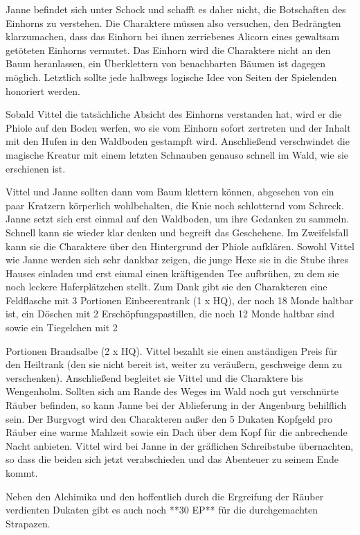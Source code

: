 Janne befindet sich unter Schock und schafft es daher nicht, die Botschaften des Einhorns zu verstehen. Die Charaktere müssen also versuchen, den Bedrängten klarzumachen, dass das Einhorn bei ihnen zerriebenes Alicorn eines gewaltsam getöteten Einhorns vermutet. Das Einhorn wird die Charaktere nicht an den Baum heranlassen, ein Überklettern von benachbarten Bäumen ist dagegen möglich. Letztlich sollte jede halbwegs logische Idee von Seiten der Spielenden honoriert werden.


Sobald Vittel die tatsächliche Absicht des Einhorns verstanden hat, wird er die Phiole auf den Boden werfen, wo sie vom Einhorn sofort zertreten und der Inhalt mit den Hufen in den Waldboden gestampft wird. Anschließend verschwindet die magische Kreatur mit einem letzten Schnauben genauso schnell im Wald, wie sie erschienen ist.


Vittel und Janne sollten dann vom Baum klettern können, abgesehen von ein paar Kratzern körperlich wohlbehalten, die Knie noch schlotternd vom Schreck. Janne setzt sich erst einmal auf den Waldboden, um ihre Gedanken zu sammeln. Schnell kann sie wieder klar denken und begreift das Geschehene. Im Zweifelsfall kann sie die Charaktere über den Hintergrund der Phiole aufklären. Sowohl Vittel wie Janne werden sich sehr dankbar zeigen, die junge Hexe sie in die Stube ihres Hauses einladen und erst einmal einen kräftigenden Tee aufbrühen, zu dem sie noch leckere Haferplätzchen stellt. Zum Dank gibt sie den Charakteren eine Feldflasche mit 3 Portionen Einbeerentrank (1 x HQ), der noch 18 Monde haltbar ist, ein Döschen mit 2 Erschöpfungspastillen, die noch 12 Monde haltbar sind sowie ein Tiegelchen mit 2 




Portionen Brandsalbe (2 x HQ). Vittel bezahlt sie einen anständigen Preis für den Heiltrank (den sie nicht bereit ist, weiter zu veräußern, geschweige denn zu verschenken).
\platz
Anschließend begleitet sie Vittel und die Charaktere bis Wengenholm. Sollten sich am Rande des Weges im Wald noch gut verschnürte Räuber befinden, so kann Janne bei der Ablieferung in der Angenburg behilflich sein. Der Burgvogt wird den Charakteren außer den 5 Dukaten Kopfgeld pro Räuber eine warme Mahlzeit sowie ein Dach über dem Kopf für die anbrechende Nacht anbieten. Vittel wird bei Janne in der gräflichen Schreibstube übernachten, so dass die beiden sich jetzt verabschieden und das Abenteuer zu seinem Ende kommt. 

Neben den Alchimika und den hoffentlich durch die Ergreifung der Räuber verdienten Dukaten gibt es auch noch **30 EP** für die durchgemachten Strapazen.


